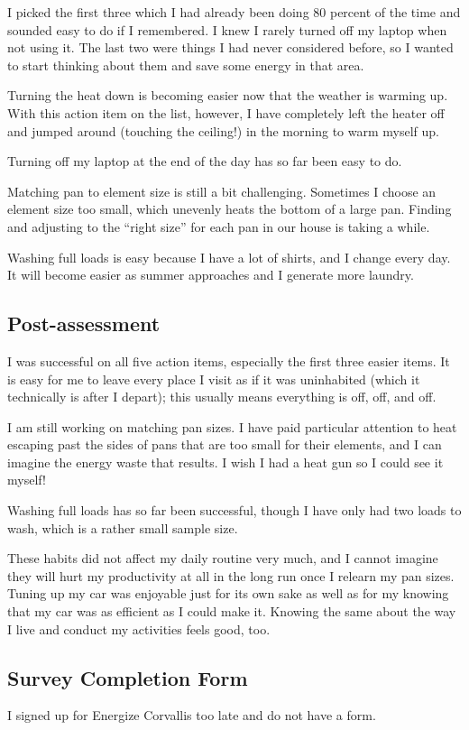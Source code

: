 \documentclass[12pt,letterpaper]{article}
\begin{document}
I picked the first three which I had already been doing 80 percent of the time
and sounded easy to do if I remembered. I knew I rarely turned off my laptop
when not using it. The last two were things I had never considered before, so
I wanted to start thinking about them and save some energy in that area.

Turning the heat down is becoming easier now that the weather is warming up.
With this action item on the list, however, I have completely left the heater
off and jumped around (touching the ceiling!) in the morning to warm myself up.

Turning off my laptop at the end of the day has so far been easy to do.

Matching pan to element size is still a bit challenging. Sometimes I choose an
element size too small, which unevenly heats the bottom of a large pan. Finding
and adjusting to the ``right size'' for each pan in our house is taking
a while.

Washing full loads is easy because I have a lot of shirts, and I change every
day. It will become easier as summer approaches and I generate more laundry.

\subsection*{Post-assessment}

I was successful on all five action items, especially the first three easier
items. It is easy for me to leave every place I visit as if it was uninhabited
(which it technically is after I depart); this usually means everything is off,
off, and off.

I am still working on matching pan sizes. I have paid particular attention to
heat escaping past the sides of pans that are too small for their elements, and
I can imagine the energy waste that results. I wish I had a heat gun so I could
see it myself!

Washing full loads has so far been successful, though I have only had two loads
to wash, which is a rather small sample size.

These habits did not affect my daily routine very much, and I cannot imagine
they will hurt my productivity at all in the long run once I relearn my pan
sizes. Tuning up my car was enjoyable just for its own sake as well as for my
knowing that my car was as efficient as I could make it. Knowing the same about
the way I live and conduct my activities feels good, too.

\subsection*{Survey Completion Form}

I signed up for Energize Corvallis too late and do not have a form.
\end{document}
